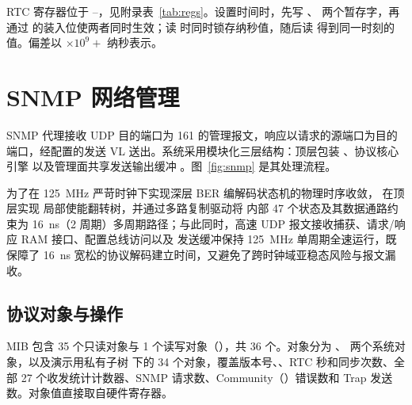 RTC 寄存器位于 --，见附录表~\ref{tab:regs}。设置时间时，先写 、 两个暂存字，再通过  的装入位使两者同时生效；读  时同时锁存纳秒值，随后读  得到同一时刻的值。偏差以 $\times 10^9 +$ 纳秒表示。


\section{SNMP 网络管理}\label{sec:snmp}

SNMP 代理接收 UDP 目的端口为 161 的管理报文，响应以请求的源端口为目的端口，经配置的发送 VL 送出。系统采用模块化三层结构：顶层包装 、协议核心引擎  以及管理面共享发送输出缓冲 。图~\ref{fig:snmp} 是其处理流程。

为了在 125~MHz 严苛时钟下实现深层 BER 编解码状态机的物理时序收敛， 在顶层实现  局部使能翻转树，并通过多路复制驱动将  内部 47 个状态及其数据通路约束为 16~ns（2 周期）多周期路径；与此同时，高速 UDP 报文接收捕获、请求/响应 RAM 接口、配置总线访问以及  发送缓冲保持 125~MHz 单周期全速运行，既保障了 16~ns 宽松的协议解码建立时间，又避免了跨时钟域亚稳态风险与报文漏收。


\subsection{协议对象与操作}

MIB 包含 35 个只读对象与 1 个读写对象（），共 36 个。对象分为 、 两个系统对象，以及演示用私有子树  下的 34 个对象，覆盖版本号、、RTC 秒和同步次数、全部 27 个收发统计计数器、SNMP 请求数、Community（）错误数和 Trap 发送数。对象值直接取自硬件寄存器。

